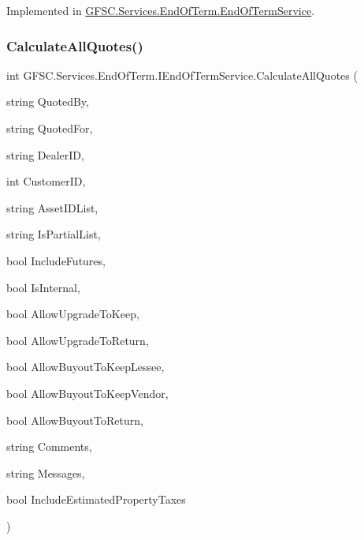 Implemented in \mbox{\hyperlink{class_g_f_s_c_1_1_services_1_1_end_of_term_1_1_end_of_term_service_a87e17fb4369ea5eaf12dfe516c551fd2}{G\+F\+S\+C.\+Services.\+End\+Of\+Term.\+End\+Of\+Term\+Service}}.

\mbox{\label{interface_g_f_s_c_1_1_services_1_1_end_of_term_1_1_i_end_of_term_service_a6452a880724034a6832ee9af55c8c659}} 
\subsubsection{\texorpdfstring{Calculate\+All\+Quotes()}{CalculateAllQuotes()}}
{\footnotesize\ttfamily int G\+F\+S\+C.\+Services.\+End\+Of\+Term.\+I\+End\+Of\+Term\+Service.\+Calculate\+All\+Quotes (\begin{DoxyParamCaption}\item[{string}]{Quoted\+By,  }\item[{string}]{Quoted\+For,  }\item[{string}]{Dealer\+ID,  }\item[{int}]{Customer\+ID,  }\item[{string}]{Asset\+I\+D\+List,  }\item[{string}]{Is\+Partial\+List,  }\item[{bool}]{Include\+Futures,  }\item[{bool}]{Is\+Internal,  }\item[{bool}]{Allow\+Upgrade\+To\+Keep,  }\item[{bool}]{Allow\+Upgrade\+To\+Return,  }\item[{bool}]{Allow\+Buyout\+To\+Keep\+Lessee,  }\item[{bool}]{Allow\+Buyout\+To\+Keep\+Vendor,  }\item[{bool}]{Allow\+Buyout\+To\+Return,  }\item[{string}]{Comments,  }\item[{string}]{Messages,  }\item[{bool}]{Include\+Estimated\+Property\+Taxes }\end{DoxyParamCaption})}



